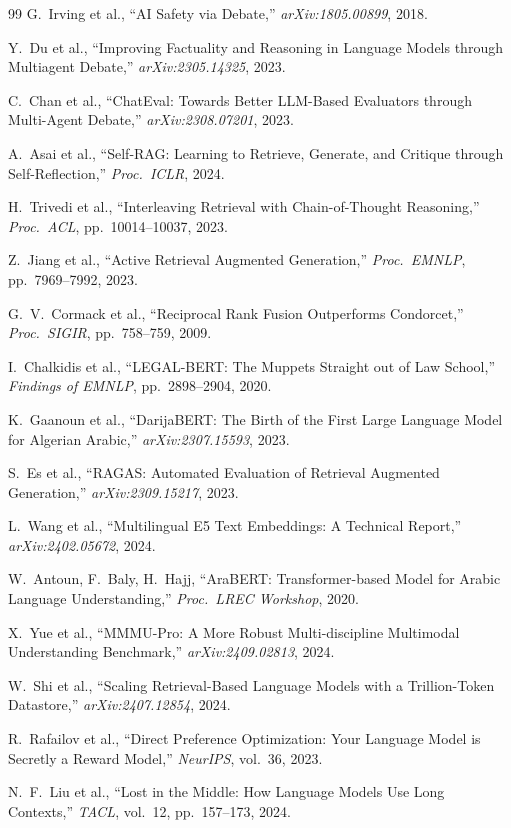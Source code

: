 \documentclass[12pt,a4paper]{article}
\begin{document}
\begin{thebibliography}{99}
G.~Irving et al., ``AI Safety via Debate,'' \textit{arXiv:1805.00899}, 2018.

Y.~Du et al., ``Improving Factuality and Reasoning in Language Models through Multiagent Debate,''
\textit{arXiv:2305.14325}, 2023.

C.~Chan et al., ``ChatEval: Towards Better LLM-Based Evaluators through Multi-Agent Debate,''
\textit{arXiv:2308.07201}, 2023.

A.~Asai et al., ``Self-RAG: Learning to Retrieve, Generate, and Critique through Self-Reflection,''
\textit{Proc.\ ICLR}, 2024.

H.~Trivedi et al., ``Interleaving Retrieval with Chain-of-Thought Reasoning,''
\textit{Proc.\ ACL}, pp.~10014--10037, 2023.

Z.~Jiang et al., ``Active Retrieval Augmented Generation,''
\textit{Proc.\ EMNLP}, pp.~7969--7992, 2023.

G.~V.~Cormack et al., ``Reciprocal Rank Fusion Outperforms Condorcet,''
\textit{Proc.\ SIGIR}, pp.~758--759, 2009.

I.~Chalkidis et al., ``LEGAL-BERT: The Muppets Straight out of Law School,''
\textit{Findings of EMNLP}, pp.~2898--2904, 2020.

K.~Gaanoun et al., ``DarijaBERT: The Birth of the First Large Language Model for Algerian Arabic,''
\textit{arXiv:2307.15593}, 2023.

S.~Es et al., ``RAGAS: Automated Evaluation of Retrieval Augmented Generation,''
\textit{arXiv:2309.15217}, 2023.

L.~Wang et al., ``Multilingual E5 Text Embeddings: A Technical Report,''
\textit{arXiv:2402.05672}, 2024.

W.~Antoun, F.~Baly, H.~Hajj, ``AraBERT: Transformer-based Model for Arabic Language Understanding,''
\textit{Proc.\ LREC Workshop}, 2020.

X.~Yue et al., ``MMMU-Pro: A More Robust Multi-discipline Multimodal Understanding Benchmark,''
\textit{arXiv:2409.02813}, 2024.

W.~Shi et al., ``Scaling Retrieval-Based Language Models with a Trillion-Token Datastore,''
\textit{arXiv:2407.12854}, 2024.

R.~Rafailov et al., ``Direct Preference Optimization: Your Language Model is Secretly a Reward Model,''
\textit{NeurIPS}, vol.~36, 2023.

N.~F.~Liu et al., ``Lost in the Middle: How Language Models Use Long Contexts,''
\textit{TACL}, vol.~12, pp.~157--173, 2024.

\end{thebibliography}
\end{document}
